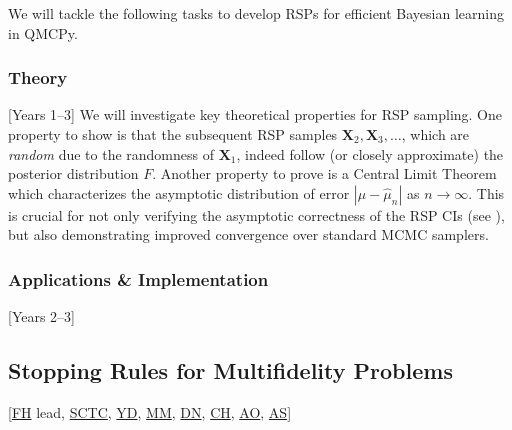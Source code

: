 \documentclass[11pt]{NSFamsart}
\newcommand{\cmtS}[1]{{\color{blue}{(Simon: #1)}}}
\newcommand{\FH}{\hyperlink{FHlink}{FH}\xspace}
\newcommand{\SM}{\hyperlink{SMlink}{SM}\xspace}
\newcommand{\SCTC}{\hyperlink{SCTClink}{SCTC}\xspace}
\newcommand{\AO}{\hyperlink{AOlink}{AO}\xspace}
\newcommand{\MM}{\hyperlink{MMlink}{MM}\xspace}
\newcommand{\CH}{\hyperlink{CHlink}{CH}\xspace}
\newcommand{\YD}{\hyperlink{YDlink}{YD}\xspace}
\newcommand{\AS}{\hyperlink{ASlink}{AS}\xspace}
\newcommand{\DN}{\hyperlink{DNlink}{DN}\xspace}
\newcommand{\bX}{{\boldsymbol{X}}}
\newcommand{\SMNote}[1]{{\color{blue}Simon: #1}}
\begin{document}
We will tackle the following tasks to develop RSPs for efficient Bayesian learning in QMCPy.
\subsubsection{Theory} [Years 1--3]
We will investigate key theoretical properties for RSP sampling. One property to show is that the subsequent RSP samples $\bX_2, \bX_3, \ldots$, which are \textit{random} due to the randomness of $\bX_1$, indeed follow (or closely approximate) the posterior distribution $F$. Another property to prove is a Central Limit Theorem which characterizes the asymptotic distribution of error $|\mu-\hat{\mu}_n|$ as $n \rightarrow \infty$. This is crucial for not only verifying the asymptotic correctness of the RSP CIs (see \cite{rosenthal2017simple}), but also demonstrating improved convergence over standard MCMC samplers.

\subsubsection{Applications \& Implementation} [Years 2--3] 
\cmtS{Discuss preliminary simulation results and ball dropping toy application. Application for turbomachinery application, where we can pull out gradients from our simulators. }





\subsection{Stopping Rules for Multifidelity Problems} [\FH lead, \SCTC, \YD, \MM, \DN, \CH, \AO, \AS{}] \label{sec:performance}
\cmtS{ideas on gauging confidence, adaptive algorithms, uncertainty quantification.} \cmtS{structure: Motivation \& preliminary results, Action tasks, Application \& implementation?}
\end{document}
